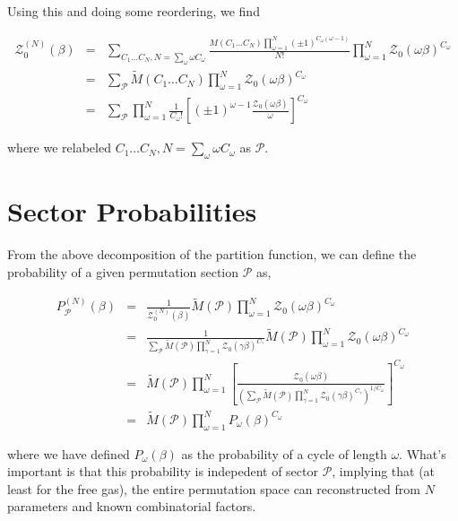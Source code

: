\documentclass[aps,preprint,showpacs,superscriptaddress,groupedaddress]{revtex4}  %
\begin{document}
Using this and doing some reordering, we find

\begin{eqnarray}
  \mathcal{Z}_{0}^{(N)}(\beta) &=& \sum_{C_{1} \dots C_{N}, N=\sum_{\omega}\omega C_{\omega}} \frac{M(C_{1} \dots C_{N}) \prod_{\omega=1}^{N} (\pm 1)^{C_{\omega}(\omega-1)}}{N!} \prod_{\omega=1}^{N} \mathcal{Z}_{0}(\omega\beta)^{C_{\omega}} \\
                               &=& \sum_{\mathcal{P}} \tilde{M}(C_{1} \dots C_{N}) \prod_{\omega=1}^{N} \mathcal{Z}_{0}(\omega\beta)^{C_{\omega}} \\
                               &=& \sum_{\mathcal{P}} \prod_{\omega=1}^{N} \frac{1}{C_{\omega}!} [(\pm 1)^{\omega-1} \frac{\mathcal{Z}_{0}(\omega\beta)}{\omega}]^{C_{\omega}}
\end{eqnarray}

where we relabeled $C_{1} \dots C_{N}, N=\sum_{\omega}\omega C_{\omega}$ as $\mathcal{P}$.


\section{Sector Probabilities}

From the above decomposition of the partition function, we can define the probability of a given permutation section $\mathcal{P}$ as,

\begin{eqnarray}
  P_{\mathcal{P}}^{(N)}(\beta) &=& \frac{1}{\mathcal{Z}_{0}^{(N)}(\beta)} \tilde{M}(\mathcal{P}) \prod_{\omega=1}^{N} \mathcal{Z}_{0}(\omega\beta)^{C_{\omega}} \\
                               &=& \frac{1}{\sum_{\mathcal{P}} \tilde{M}(\mathcal{P}) \prod_{\gamma=1}^{N} \mathcal{Z}_{0}(\gamma\beta)^{C_{\gamma}}} \tilde{M}(\mathcal{P}) \prod_{\omega=1}^{N} \mathcal{Z}_{0}(\omega\beta)^{C_{\omega}} \\
                               &=& \tilde{M}(\mathcal{P}) \prod_{\omega=1}^{N} [\frac{\mathcal{Z}_{0}(\omega\beta)}{(\sum_{\mathcal{P}} \tilde{M}(\mathcal{P}) \prod_{\gamma=1}^{N} \mathcal{Z}_{0}(\gamma\beta)^{C_{\gamma}})^{1/C_{\omega}}}]^{C_{\omega}} \\
                               &=& \tilde{M}(\mathcal{P}) \prod_{\omega=1}^{N} P_{\omega}(\beta)^{C_{\omega}}
\end{eqnarray}

where we have defined $P_{\omega}(\beta)$ as the probability of a cycle of length $\omega$. What's important is that this probability is indepedent of sector $\mathcal{P}$, implying that (at least for the free gas), the entire permutation space can reconstructed from $N$ parameters and known combinatorial factors.
\end{document}
